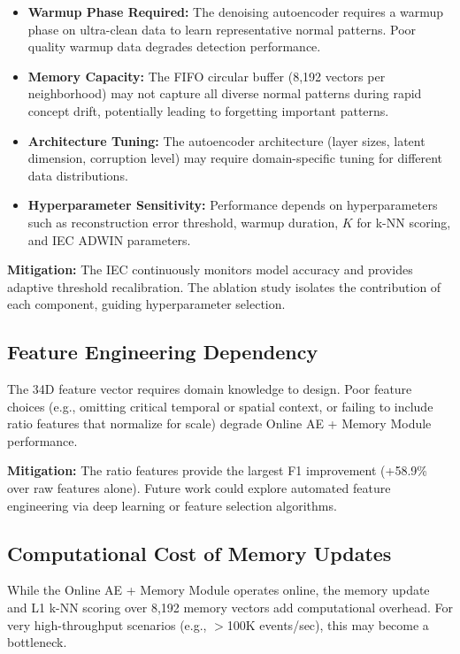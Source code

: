 \begin{itemize}
    \item \textbf{Warmup Phase Required:} The denoising autoencoder requires a warmup phase on ultra-clean data to learn representative normal patterns. Poor quality warmup data degrades detection performance.
    \item \textbf{Memory Capacity:} The FIFO circular buffer (8,192 vectors per neighborhood) may not capture all diverse normal patterns during rapid concept drift, potentially leading to forgetting important patterns.
    \item \textbf{Architecture Tuning:} The autoencoder architecture (layer sizes, latent dimension, corruption level) may require domain-specific tuning for different data distributions.
    \item \textbf{Hyperparameter Sensitivity:} Performance depends on hyperparameters such as reconstruction error threshold, warmup duration, $K$ for k-NN scoring, and IEC ADWIN parameters.
\end{itemize}

\textbf{Mitigation:} The IEC continuously monitors model accuracy and provides adaptive threshold recalibration. The ablation study isolates the contribution of each component, guiding hyperparameter selection.

\subsection{Feature Engineering Dependency}

The 34D feature vector requires domain knowledge to design. Poor feature choices (e.g., omitting critical temporal or spatial context, or failing to include ratio features that normalize for scale) degrade Online AE + Memory Module performance.

\textbf{Mitigation:} The ratio features provide the largest F1 improvement (+58.9\% over raw features alone). Future work could explore automated feature engineering via deep learning or feature selection algorithms.

\subsection{Computational Cost of Memory Updates}

While the Online AE + Memory Module operates online, the memory update and L1 k-NN scoring over 8,192 memory vectors add computational overhead. For very high-throughput scenarios (e.g., $>$100K events/sec), this may become a bottleneck.

